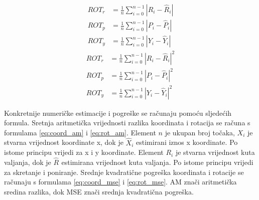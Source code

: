 \begin{equation}
  \begin{aligned}
ROT_{r} &= \frac{1}{n}\sum_{i=0}^{n-1} |R_{i} - \hat{R}_{i}|\\
ROT_{p} &= \frac{1}{n}\sum_{i=0}^{n-1} |P_{i} - \hat{P}_{i}|\\
ROT_{y} &= \frac{1}{n}\sum_{i=0}^{n-1} |Y_{i} - \hat{Y}_{i}|
  \end{aligned}
  \label{eq:rot_am}
\end{equation}
\begin{equation}
  \begin{aligned}
ROT_{r} &= \frac{1}{n}\sum_{i=0}^{n-1} |R_{i} - \hat{R}_{i}|^2\\
ROT_{p} &= \frac{1}{n}\sum_{i=0}^{n-1} |P_{i} - \hat{P}_{i}|^2\\
ROT_{y} &= \frac{1}{n}\sum_{i=0}^{n-1} |Y_{i} - \hat{Y}_{i}|^2
  \end{aligned}
  \label{eq:rot_mse}
\end{equation}

Konkretnije numeričke estimacije i pogreške se računaju pomoću sljedećih formula. Sretnja aritmetička vrijednosti razlika koordinata i rotacija se računa s formulama \ref{eq:coord_am} i \ref{eq:rot_am}. Element $n$ je ukupan broj točaka, $X_{i}$ je stvarna vrijednost koordinate x, dok je $\hat{X}_{i}$ estimirani iznos x koordinate. Po istome principu vrijedi za x i y koordinate. Element $R_{i}$ je stvarna vrijednost kuta valjanja, dok je $\hat{R}_{}$ estimirana vrijednost kuta valjanja. Po istome principu vrijedi za skretanje i poniranje. Srednje kvadratične pogreška koordinata i rotacije se računaju s formulama \ref{eq:coord_mse} i \ref{eq:rot_mse}. AM znači aritmetička sredina razlika, dok MSE znači srednja kvadratična pogreška.
\pagebreak